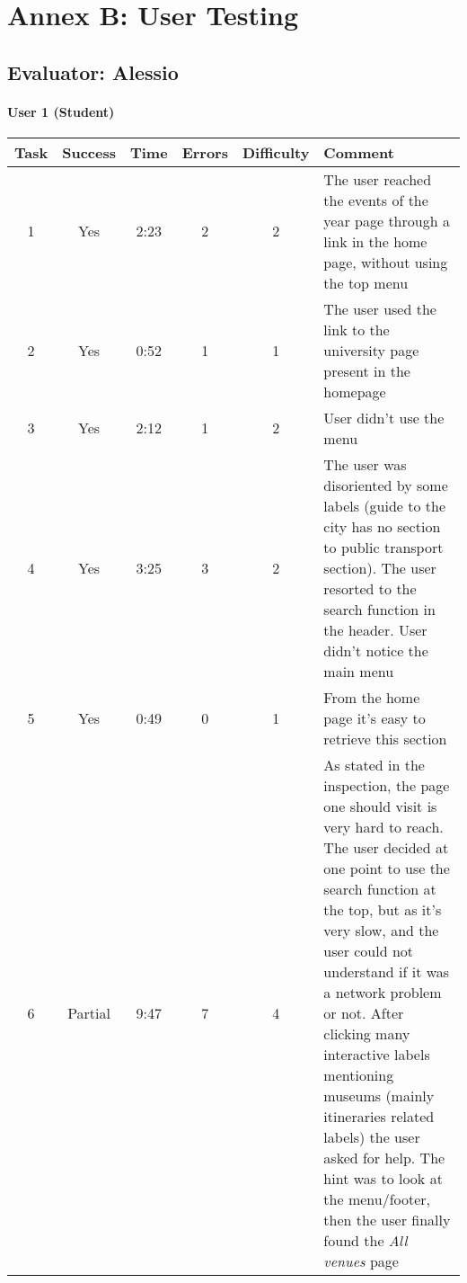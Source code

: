 
\section{Annex B: User Testing}

\begin{small}

\subsection{Evaluator: Alessio}

\paragraph{User 1 (Student)}
\begin{tabularx}{\linewidth}{c c c c c X}
    \toprule
    \textbf{Task} & \textbf{Success} & \textbf{Time}
     & \textbf{Errors} & \textbf{Difficulty} & \textbf{Comment} \\
    \midrule
    1 & Yes & 2:23 & 2 & 2 & The user reached the events of the year page through a link in the home page, without using the top menu \\ \midrule
    2 & Yes & 0:52 & 1 & 1 & The user used the link to the university page present in the homepage \\ \midrule
    3 & Yes & 2:12 & 1 & 2 & User didn't use the menu \\ \midrule
    4 & Yes & 3:25 & 3 & 2 & The user was disoriented by some labels (guide to the city has no section to public transport section).  The user resorted to the search function in the header. User didn't notice the main menu \\ \midrule
    5 & Yes & 0:49 & 0 & 1 & From the home page it's easy to retrieve this section \\ \midrule
    6 & Partial & 9:47 & 7 & 4 & As stated in the inspection, the page one should visit is very hard to reach. The user decided at one point to use the search function at the top, but as it's very slow, and the user could not understand if it was a network problem or not. After clicking many interactive labels mentioning museums (mainly itineraries related labels) the user asked for help. The hint was to look at the menu/footer, then the user finally found the \emph{All venues} page \\ \bottomrule
\end{tabularx}


\end{small}
